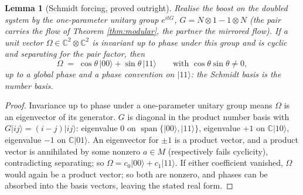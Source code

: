 \documentclass[11pt]{article}
\newtheorem{lemma}[theorem]{Lemma}
\theoremstyle{definition}
\newcommand{\C}{\mathbb{C}}
\begin{document}
\begin{lemma}[Schmidt forcing, proved outright]\label{lem:schmidt}
Realise the boost on the doubled system by the one-parameter unitary group $e^{i t G}$, $G = N \otimes 1 - 1 \otimes N$ (the pair carries the flow of Theorem \ref{thm:modular}, the partner the mirrored flow). If a unit vector $\Omega \in \C^2 \otimes \C^2$ is invariant up to phase under this group and is cyclic and separating for the pair factor, then
\[
\Omega \;=\; \cos\theta\,|00\rangle + \sin\theta\,|11\rangle \qquad \text{with } \cos\theta\sin\theta \neq 0 ,
\]
up to a global phase and a phase convention on $|11\rangle$: the Schmidt basis is the number basis.
\end{lemma}

\begin{proof}
Invariance up to phase under a one-parameter unitary group means $\Omega$ is an eigenvector of its generator. $G$ is diagonal in the product number basis with $G|ij\rangle = (i - j)|ij\rangle$: eigenvalue $0$ on $\operatorname{span}\{|00\rangle, |11\rangle\}$, eigenvalue $+1$ on $\C|10\rangle$, eigenvalue $-1$ on $\C|01\rangle$. An eigenvector for $\pm 1$ is a product vector, and a product vector is annihilated by some nonzero $a \in M$ (respectively fails cyclicity), contradicting separating; so $\Omega = c_0|00\rangle + c_1|11\rangle$. If either coefficient vanished, $\Omega$ would again be a product vector; so both are nonzero, and phases can be absorbed into the basis vectors, leaving the stated real form.
\end{proof}
\end{document}
